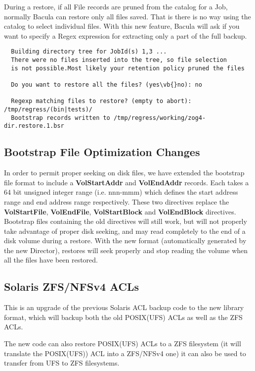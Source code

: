   During a restore, if all File records are pruned from the catalog
  for a Job, normally Bacula can restore only all files saved. That
  is there is no way using the catalog to select individual files.
  With this new feature, Bacula will ask if you want to specify a Regex
  expression for extracting only a part of the full backup.

\begin{verbatim}
  Building directory tree for JobId(s) 1,3 ...
  There were no files inserted into the tree, so file selection
  is not possible.Most likely your retention policy pruned the files
  
  Do you want to restore all the files? (yes\vb{}no): no
  
  Regexp matching files to restore? (empty to abort): /tmp/regress/(bin|tests)/
  Bootstrap records written to /tmp/regress/working/zog4-dir.restore.1.bsr
\end{verbatim}

\subsection{Bootstrap File Optimization Changes}
In order to permit proper seeking on disk files, we have extended the bootstrap
file format to include a {\bf VolStartAddr} and {\bf VolEndAddr} records. Each
takes a 64 bit unsigned integer range (i.e. nnn-mmm) which defines the start
address range and end address range respectively.  These two directives replace
the {\bf VolStartFile}, {\bf VolEndFile}, {\bf VolStartBlock} and {\bf
  VolEndBlock} directives.  Bootstrap files containing the old directives will
still work, but will not properly take advantage of proper disk seeking, and
may read completely to the end of a disk volume during a restore.  With the new
format (automatically generated by the new Director), restores will seek
properly and stop reading the volume when all the files have been restored.

\subsection{Solaris ZFS/NFSv4 ACLs}
This is an upgrade of the previous Solaris ACL backup code
to the new library format, which will backup both the old
POSIX(UFS) ACLs as well as the ZFS ACLs.

The new code can also restore POSIX(UFS) ACLs to a ZFS filesystem
(it will translate the POSIX(UFS)) ACL into a ZFS/NFSv4 one) it can also
be used to transfer from UFS to ZFS filesystems.


